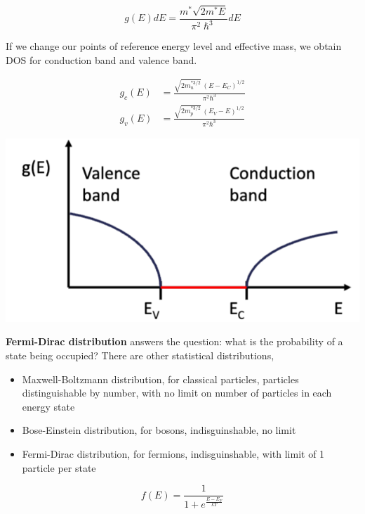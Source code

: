 \documentclass[a4paper,10pt]{article}
\begin{document}
\begin{multicols}{3}
$$g(E) dE = \frac{m^* \sqrt{2 m^* E}}{\pi^2 \hslash^3} dE$$

If we change our points of reference energy level and effective mass, we obtain DOS for conduction band and valence band.

\begin{align*}
    g_c(E) &= \frac{\sqrt{2 m_n^{*3/2}} \, (E - E_C)^{1/2}}{\pi^2 \hbar^3} \\
    g_v(E) &= \frac{\sqrt{2 m_p^{*3/2}} \, (E_V - E)^{1/2}}{\pi^2 \hbar^3}
\end{align*}

\begin{center}
    \includegraphics[width=\columnwidth]{../img/Pasted image 20241008113136.png}
\end{center}

\textbf{Fermi-Dirac distribution} answers the question: what is the probability of a state being occupied? There are other statistical distributions,

\begin{itemize}[noitemsep, topsep=0pt, left=0pt]
    \item Maxwell-Boltzmann distribution, for classical particles, particles distinguishable by number, with no limit on number of particles in each energy state
    \item Bose-Einstein distribution, for bosons, indisguinshable, no limit
    \item Fermi-Dirac distribution, for fermions, indisguinshable, with limit of 1 particle per state
\end{itemize}

$$f(E) = \frac{1}{1 + e^{\frac{E - E_F}{kT}}}$$


\end{multicols}
\end{document}
